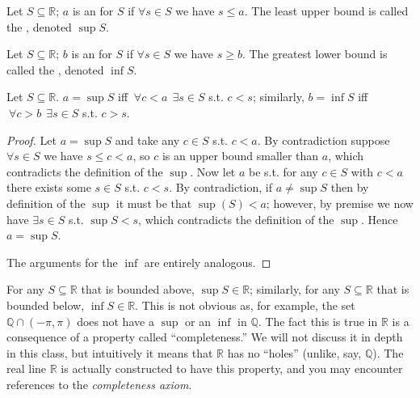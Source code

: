 \documentclass{article}
\begin{document}
\begin{definition}
  Let $S \subseteq \mathbb{R}$; $a$ is an  for $S$ if $\forall s \in S$ we have $s \le a$. The least upper bound is called the , denoted $\sup S$.
\end{definition}

\begin{definition}
  Let $S \subseteq \mathbb{R}$; $b$ is an  for $S$ if $\forall s \in S$ we have $s \ge b$. The greatest lower bound is called the , denoted $\inf S$.
\end{definition}

\begin{claim}
  Let $S \subseteq \mathbb{R}$. $a = \sup S$ iff $~ \forall c < a ~~ \exists s \in S$ s.t. $c < s$; similarly, $b = \inf S$ iff $~ \forall c > b ~~ \exists s \in S$ s.t. $c > s$.
\end{claim}

\begin{proof}
  Let $a = \sup S$ and take any $c \in S$ s.t. $c < a$. By contradiction suppose $\forall s \in S$ we have $s \le c < a$, so $c$ is an upper bound smaller than $a$, which contradicts the definition of the $\sup$. Now let $a$ be s.t. for any $c \in S$ with $c < a$ there exists some $s \in S$ s.t. $c < s$. By contradiction, if $a \ne \sup S$ then by definition of the $\sup$ it must be that $\sup(S) < a$; however, by premise we now have $\exists s \in S$ s.t. $\sup S < s$, which contradicts the definition of the $\sup$. Hence $a = \sup S$.

  The arguments for the $\inf$ are entirely analogous.
\end{proof}

\begin{remark}
  For any $S \subseteq \mathbb{R}$ that is bounded above, $\sup S \in \mathbb{R}$; similarly, for any $S \subseteq \mathbb{R}$ that is bounded below, $\inf S \in \mathbb{R}$. This is not obvious as, for example, the set $\mathbb{Q} \cap (-\pi, \pi)$ does not have a $\sup$ or an $\inf$ in $\mathbb{Q}$. The fact this is true in $\mathbb{R}$ is a consequence of a property called ``completeness.'' We will not discuss it in depth in this class, but intuitively it means that $\mathbb{R}$ has no ``holes'' (unlike, say, $\mathbb{Q}$). The real line $\mathbb{R}$ is actually constructed to have this property, and you may encounter references to the \textit{completeness axiom}.
\end{remark}
\end{document}
